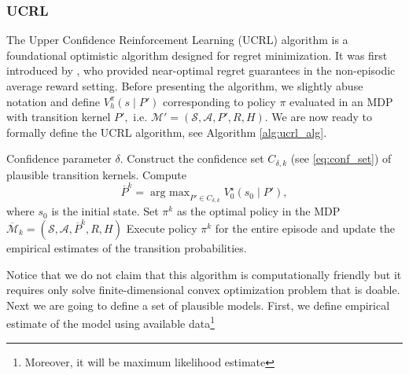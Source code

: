 \documentclass{article}
\numberwithin{equation}{section}
\newcommand{\cA}{\mathcal{A}}
\newcommand{\cS}{\mathcal{S}}
\DeclareMathOperator*{\argmax}{arg\ max}
\begin{document}
\subsubsection{UCRL}
The Upper Confidence Reinforcement Learning (UCRL) algorithm is a foundational optimistic algorithm designed for regret minimization. It was first introduced by \citet{jaksch2010near}, who provided near-optimal regret guarantees in the non-episodic average reward setting. Before presenting the algorithm, we slightly abuse notation and define  $V^\pi_h(s\mid P')$ corresponding to policy \(\pi\) evaluated in an MDP with transition kernel \(P',\) i.e. $\mathcal{M}' = (\cS, \cA, P', R, H)$. We are now ready to formally define the UCRL algorithm, see Algorithm \ref{alg:ucrl_alg}.
\begin{algorithm}
    \caption{UCRL}
    \begin{algorithmic}[1]\label{alg:ucrl_alg}
        \REQUIRE Confidence parameter \(\delta\).
            \STATE Construct the confidence set \(C_{\delta,k}\) (see \eqref{eq:conf_set}) of plausible transition kernels.
            \STATE Compute 
            \[
                \overline{P}^k = \argmax_{P' \in C_{\delta, k}} V^\star_0({s_0} \mid P'),
            \]
            where \(s_0\) is the initial state.  Set \(\pi^k\) as the optimal policy in the MDP 
            \({\overline{\mathcal{M}}_{k}} =(\cS, \cA, \overline{P}^k, R, H) \)
            \STATE Execute policy \(\pi^k\) for the entire episode and update the empirical estimates of the transition probabilities.
        \ENDFOR
    \end{algorithmic}
\end{algorithm}

Notice that we do not claim that this algorithm is computationally friendly but it requires only solve finite-dimensional convex optimization problem that is doable.
Next we are going to define a set of plausible models. First, we define empirical estimate of the model using available data\footnote{Moreover, it will be maximum likelihood estimate}
\end{document}
